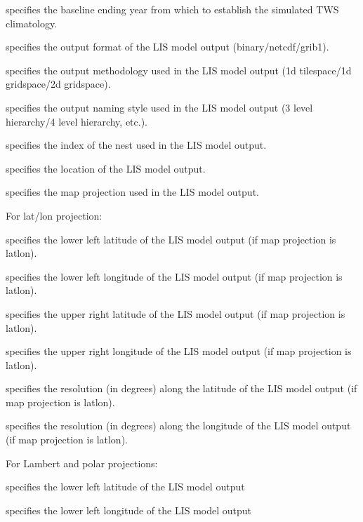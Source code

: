  specifies the baseline ending year from which to establish the
 simulated TWS climatology.

 specifies the output format of the LIS model output
 (binary/netcdf/grib1).

 specifies the output methodology used in the LIS model output
 (1d tilespace/1d gridspace/2d gridspace).

 specifies the output naming style used in the LIS model output 
 (3 level hierarchy/4 level hierarchy, etc.).

 specifies the index of the nest used in the LIS model output.

 specifies the location of the LIS model output.

 specifies the map projection used in the LIS model output.

 For lat/lon projection:

 specifies the lower left latitude of the LIS model output
 (if map projection is latlon).

 specifies the lower left longitude of the LIS model output
 (if map projection is latlon).

 specifies the upper right latitude of the LIS model output
 (if map projection is latlon).

 specifies the upper right longitude of the LIS model output
 (if map projection is latlon).

 specifies the resolution (in degrees) along the latitude of the
 LIS model output (if map projection is latlon).

 specifies the resolution (in degrees) along the longitude of the
 LIS model output (if map projection is latlon).

 For Lambert and polar projections:

 specifies the lower left latitude of the LIS model output

 specifies the lower left longitude of the LIS model output

